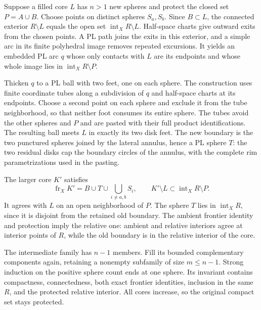 Suppose a filled core $L$ has $n>1$ new spheres and protect the closed set
$P=A\cup B$. Choose points on distinct spheres $S_a,S_b$. Since
$B\subset L$, the connected exterior $R\setminus L$ equals the open set
$\operatorname{int}_X R\setminus L$. Half-space charts give outward exits
from the chosen points. A PL path joins the exits in this exterior, and
a simple arc in its finite polyhedral image removes repeated excursions.
It yields an embedded PL arc $q$ whose only contacts with $L$ are its
endpoints and whose whole image lies in $\operatorname{int}_X R\setminus P$.

Thicken $q$ to a PL ball with two feet, one on each sphere. The construction
uses finite coordinate tubes along a subdivision of $q$ and half-space
charts at its endpoints. Choose a second point on each sphere and exclude
it from the tube neighborhood, so that neither foot consumes its entire
sphere. The tubes avoid the other spheres and $P$ and are pasted with
their full product identifications. The resulting ball meets $L$ in
exactly its two disk feet. The new boundary is the two punctured spheres
joined by the lateral annulus, hence a PL sphere $T$: the two residual
disks cap the boundary circles of the annulus, with the complete rim
parametrizations used in the pasting.

The larger core $K'$ satisfies
\[
 \operatorname{fr}_X K'=B\cup T\cup\bigcup_{i\ne a,b}S_i,
 \qquad K'\setminus L\subset\operatorname{int}_X R\setminus P.
\]
It agrees with $L$ on an open neighborhood of $P$. The sphere $T$ lies
in $\operatorname{int}_X R$, since it is disjoint from the retained old
boundary. The ambient frontier identity and protection imply the relative
one: ambient and relative interiors agree at interior points of $R$,
while the old boundary is in the relative interior of the core.

The intermediate family has $n-1$ members. Fill its bounded complementary
components again, retaining a nonempty subfamily of size $m\leq n-1$.
Strong induction on the positive sphere count ends at one sphere. Its
invariant contains compactness, connectedness, both exact frontier
identities, inclusion in the same $R$, and the protected relative interior.
All cores increase, so the original compact set stays protected.

